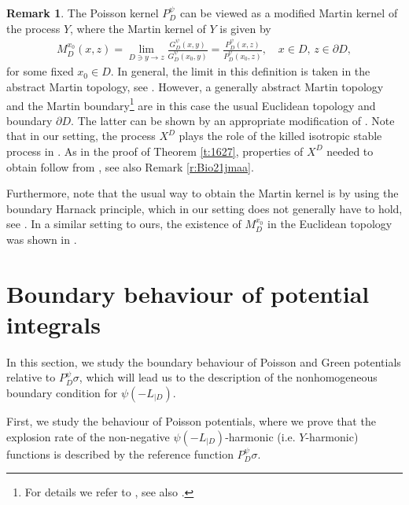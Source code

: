 \documentclass[12pt,a4paper,onecolumn]{article}
\theoremstyle{definition}
\newtheorem{rem}[thm]{Remark}
\newcommand{\1}{\mathbf 1}
\newcommand{\Lo}{\psi(-L_{|D})}
\newcommand{\GDP}{G_D^\psi}
\newcommand{\PDS}{P^{\psi}_{ D}}
\numberwithin{equation}{section}
\begin{document}
    \begin{rem}\label{r:martin}
The Poisson kernel $\PDS$ can be viewed as a modified Martin kernel of the process $Y$, where the Martin kernel of $Y$ is given by
	\begin{align*}
		M^{x_0}_D(x,z)=\lim_{ D\ni  y\to z}\frac{\GDP(x,y)}{\GDP(x_0,y)}=\frac{\PDS(x,z)}{\PDS(x_0,z)},\quad x\in D,\,z\in
		\partial D,
	\end{align*}
	for some fixed $x_0\in D$. In general, the limit in this definition is taken in the abstract Martin topology, see \cite{KW_martin}. However, a generally abstract Martin topology and the Martin boundary\footnote{For details we refer to \cite[p. 560 and p. 546]{ksv_RMI18}, see also \cite{KW_martin}.} are in this case the usual Euclidean topology and boundary $\partial D$. The latter can be shown by an appropriate modification of \cite[Theorem 4.3]{SongVondracek2006potenSpecial}. Note that in our setting, the process $X^D$ plays the role of the killed isotropic stable process in \cite{SongVondracek2006potenSpecial}. As in the proof of Theorem \ref{t:1627}, properties of $X^D$ needed to obtain \cite[Theorem 4.3]{SongVondracek2006potenSpecial}  follow from \cite{Bio21jmaa}, see also Remark \ref{r:Bio21jmaa}.
    
    Furthermore, note that the usual way to obtain the Martin kernel is by using the boundary Harnack principle, which in our setting does not generally have to hold, see \cite[Section 9]{ksv2020boundary}. In a similar setting to ours, the existence of $M_D^{x_0}$ in the Euclidean topology was shown in \cite[Section 4]{SongVondracek2006potenSpecial}.
    \end{rem}
    
	\section{Boundary behaviour of potential integrals}\label{s:boundary}
	In this section, we study the boundary behaviour of Poisson and Green potentials relative to $\PDS\sigma$, which will lead us to the description of the nonhomogeneous boundary condition for $\Lo$.
	
	First, we study the behaviour of Poisson potentials, where we prove that the explosion rate of the non-negative $\Lo$-harmonic (i.e. $Y$-harmonic) functions is described by the reference function $\PDS\sigma$. 
	
\end{document}
